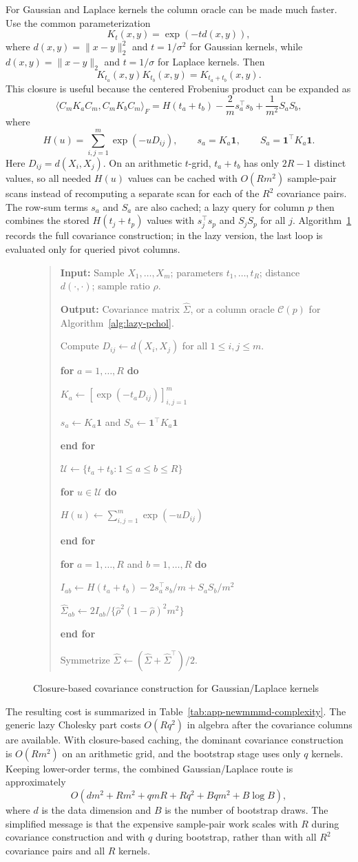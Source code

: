 \documentclass[12pt]{article}
\newenvironment{algorithm}[1][]{\begin{figure}[H]\small}{\end{figure}}
\newenvironment{algorithmic}[1][]{\begin{quote}\small}{\end{quote}}
\newcommand{\Require}{\par\noindent\textbf{Input:} }
\newcommand{\Ensure}{\par\noindent\textbf{Output:} }
\newcommand{\State}{\par\noindent}
\newcommand{\For}[1]{\par\noindent\textbf{for} #1 \textbf{do}}
\newcommand{\EndFor}{\par\noindent\textbf{end for}}
\begin{document}
For Gaussian and Laplace kernels the column oracle can be made much faster. Use the common parameterization
\[
  K_t(x,y)=\exp(-t d(x,y)),
\]
where $d(x,y)=\lVert x-y\rVert_2^2$ and $t=1/\sigma^2$ for Gaussian kernels, while $d(x,y)=\lVert x-y\rVert_2$ and $t=1/\sigma$ for Laplace kernels. Then
\[
  K_{t_a}(x,y)K_{t_b}(x,y)=K_{t_a+t_b}(x,y).
\]
This closure is useful because the centered Frobenius product can be expanded as
\[
  \langle C_mK_aC_m,C_mK_bC_m\rangle_F
  =H(t_a+t_b)-\frac{2}{m}s_a^{\top}s_b+\frac{1}{m^2}S_aS_b,
\]
where
\[
  H(u)=\sum_{i,j=1}^{m}\exp(-uD_{ij}),\qquad
  s_a=K_a\mathbf{1},\qquad
  S_a=\mathbf{1}^{\top}K_a\mathbf{1}.
\]
Here $D_{ij}=d(X_i,X_j)$. On an arithmetic $t$-grid, $t_a+t_b$ has only $2R-1$ distinct values, so all needed $H(u)$ values can be cached with $O(Rm^2)$ sample-pair scans instead of recomputing a separate scan for each of the $R^2$ covariance pairs. The row-sum terms $s_a$ and $S_a$ are also cached; a lazy query for column $p$ then combines the stored $H(t_j+t_p)$ values with $s_j^{\top}s_p$ and $S_jS_p$ for all $j$. Algorithm~\ref{alg:closure-cov} records the full covariance construction; in the lazy version, the last loop is evaluated only for queried pivot columns.

\begin{algorithm}[H]
\caption{Closure-based covariance construction for Gaussian/Laplace kernels}
\label{alg:closure-cov}
\begin{algorithmic}[1]
\Require Sample $X_1,\ldots,X_m$; parameters $t_1,\ldots,t_R$; distance $d(\cdot,\cdot)$; sample ratio $\widehat{\rho}$.
\Ensure Covariance matrix $\widehat{\Sigma}$, or a column oracle $\mathcal{C}(p)$ for Algorithm~\ref{alg:lazy-pchol}.
\State Compute $D_{ij}\gets d(X_i,X_j)$ for all $1\le i,j\le m$.
\For{$a=1,\ldots,R$}
  \State $K_a\gets[\exp(-t_aD_{ij})]_{i,j=1}^m$
  \State $s_a\gets K_a\mathbf{1}$ and $S_a\gets\mathbf{1}^{\top}K_a\mathbf{1}$
\EndFor
\State $\mathcal{U}\gets\{t_a+t_b:1\le a\le b\le R\}$
\For{$u\in\mathcal{U}$}
  \State $H(u)\gets\sum_{i,j=1}^{m}\exp(-uD_{ij})$
\EndFor
\For{$a=1,\ldots,R$ and $b=1,\ldots,R$}
  \State $I_{ab}\gets H(t_a+t_b)-2s_a^{\top}s_b/m+S_aS_b/m^2$
  \State $\widehat{\Sigma}_{ab}\gets 2I_{ab}/\{\widehat{\rho}^{2}(1-\widehat{\rho})^{2}m^2\}$
\EndFor
\State Symmetrize $\widehat{\Sigma}\gets(\widehat{\Sigma}+\widehat{\Sigma}^{\top})/2$.
\end{algorithmic}
\end{algorithm}

The resulting cost is summarized in Table~\ref{tab:app-newmmmd-complexity}. The generic lazy Cholesky part costs $O(Rq^2)$ in algebra after the covariance columns are available. With closure-based caching, the dominant covariance construction is $O(Rm^2)$ on an arithmetic grid, and the bootstrap stage uses only $q$ kernels. Keeping lower-order terms, the combined Gaussian/Laplace route is approximately
\[
  O(dm^2+Rm^2+qmR+Rq^2+Bqm^2+B\log B),
\]
where $d$ is the data dimension and $B$ is the number of bootstrap draws. The simplified message is that the expensive sample-pair work scales with $R$ during covariance construction and with $q$ during bootstrap, rather than with all $R^2$ covariance pairs and all $R$ kernels.
\end{document}
